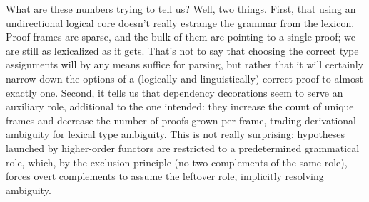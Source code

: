 What are these numbers trying to tell us?
Well, two things.
First, that using an undirectional logical core doesn't really estrange the grammar from the lexicon.
Proof frames are sparse, and the bulk of them are pointing to a single proof; we are still as lexicalized as it gets.
That's not to say that choosing the correct type assignments will by any means suffice for parsing, but rather that it will certainly narrow down the options of a (logically and linguistically) correct proof to almost exactly one.
Second, it tells us that dependency decorations seem to serve an auxiliary role, additional to the one intended: they increase the count of unique frames and decrease the number of proofs grown per frame, trading derivational ambiguity for lexical type ambiguity.
This is not really surprising: hypotheses launched by higher-order functors are restricted to a predetermined grammatical role, which, by the exclusion principle (no two complements of the same role), forces overt complements to assume the leftover role, implicitly resolving ambiguity.
\goodbreak


